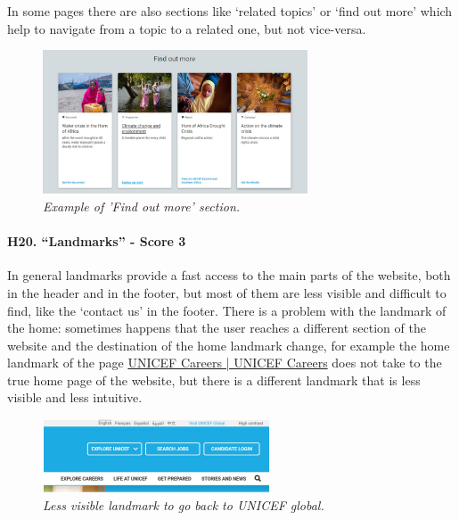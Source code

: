 \newline In some pages there are also sections like ‘related topics’ or ‘find out more’ which help to navigate from a topic to a related one, but not vice-versa.
\begin{figure}[!h]
	\begin{center}
		\includegraphics[width=0.7\textwidth]{FinalScores22.jpg}
		\captionsetup{font=small}
		\caption{\textit{Example of 'Find out more' section.}}
	\end{center}
\end{figure}
\newline
\newline \paragraph{H20. “Landmarks” - Score 3}	\label{subsec:H20}In general landmarks provide a fast access to the main parts of the website, both in the header and in the footer, but most of them are less visible and difficult to find, like the ‘contact us’ in the footer.
\newline There is a problem with the landmark of the home: sometimes happens that the user reaches a different section of the website and the destination of the home landmark change, for example the home landmark of the page \href{https://www.unicef.org/careers/}{UNICEF Careers | UNICEF Careers} does not take to the true home page of the website, but there is a different landmark that is less visible and less intuitive.
\begin{figure}[!h]
	\begin{center}
		\includegraphics[width=0.6\textwidth]{FinalScores23.jpg}
		\captionsetup{font=small}
		\caption{\textit{Less visible landmark to go back to UNICEF global.}}
	\end{center}
\end{figure}
